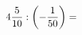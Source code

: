 \documentclass[preview]{standalone}
\begin{document}
\begin{align*}
4 { 5 \over 10 }  :  \left( - { 1 \over 50 } \right)  =
\end{align*}
\end{document}
